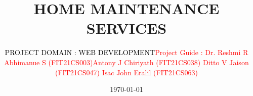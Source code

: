 \documentclass{beamer} %
\title[\textcolor{red}{}]{\textbf{HOME MAINTENANCE SERVICES}}
\author[\textcolor{white}{}]{\textcolor{black}{PROJECT DOMAIN : WEB DEVELOPMENT}{\textcolor{red}{\newline Project Guide : Dr. Reshmi R \newline Abhimanue S (FIT21CS003)\newline Antony J Chiriyath (FIT21CS038) \newline Ditto V Jaison (FIT21CS047) \newline Isac John Eralil (FIT21CS063)}}}
\date{\today}
\begin{document}
\begin{frame}
  \titlepage
  
\end{frame}


\end{document}

